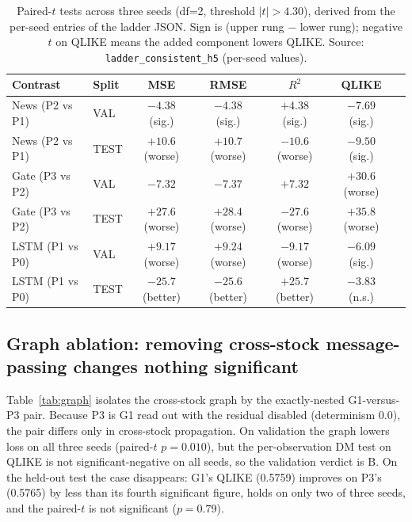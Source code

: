 \documentclass[runningheads]{llncs}
\newcommand{\GtestQ}{0.5759}     %
\newcommand{\PthreeTestQ}{0.5765}%
\newcommand{\graphTestP}{0.79}   %
\newcommand{\graphValP}{0.010}   %
\newcommand{\tcrit}{4.30}
\begin{document}
\begin{table}[t]
\caption{Paired-$t$ tests across three seeds (df=2, threshold $|t|>\tcrit$), derived from the per-seed
entries of the ladder JSON. Sign is (upper rung $-$ lower rung); negative $t$ on QLIKE means the added
component lowers QLIKE. Source: \texttt{ladder\_consistent\_h5} (per-seed values).}
\label{tab:pairedt}
\centering
\begin{tabular}{llccccc}
\toprule
Contrast & Split & MSE & RMSE & $R^2$ & QLIKE \\
\midrule
News (P2 vs P1) & VAL  & $-4.38$ (sig.) & $-4.38$ (sig.) & $+4.38$ (sig.) & $-7.69$ (sig.) \\
News (P2 vs P1) & TEST & $+10.6$ (worse) & $+10.7$ (worse) & $-10.6$ (worse) & $-9.50$ (sig.) \\
Gate (P3 vs P2) & VAL  & $-7.32$ & $-7.37$ & $+7.32$ & $+30.6$ (worse) \\
Gate (P3 vs P2) & TEST & $+27.6$ (worse) & $+28.4$ (worse) & $-27.6$ (worse) & $+35.8$ (worse) \\
LSTM (P1 vs P0) & VAL  & $+9.17$ (worse) & $+9.24$ (worse) & $-9.17$ (worse) & $-6.09$ (sig.) \\
LSTM (P1 vs P0) & TEST & $-25.7$ (better) & $-25.6$ (better) & $+25.7$ (better) & $-3.83$ (n.s.) \\
\bottomrule
\end{tabular}
\end{table}

\subsection{Graph ablation: removing cross-stock message-passing changes nothing significant}
\label{sec:graph}
Table~\ref{tab:graph} isolates the cross-stock graph by the exactly-nested G1-versus-P3 pair. Because P3
is G1 read out with the residual disabled (determinism $0.0$), the pair differs only in cross-stock
propagation. On validation the graph lowers loss on all three seeds (paired-$t$ $p=\graphValP$), but the
per-observation DM test on QLIKE is not significant-negative on all seeds, so the validation verdict is B.
On the held-out test the case disappears: G1's QLIKE (\GtestQ) improves on P3's (\PthreeTestQ) by less than
its fourth significant figure, holds on only two of three seeds, and the paired-$t$ is not significant
($p=\graphTestP$).
\end{document}

